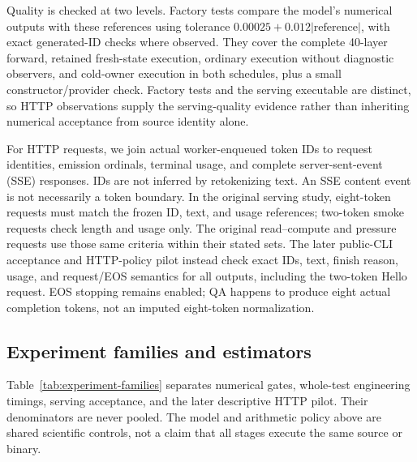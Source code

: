 Quality is checked at two levels. Factory tests compare the model's numerical
outputs with these references using tolerance
$0.00025+0.012|\mathrm{reference}|$, with exact generated-ID checks where
observed. They cover the complete 40-layer forward, retained fresh-state
execution, ordinary execution without diagnostic observers, and cold-owner
execution in both schedules, plus a small constructor/provider check.
Factory tests and the serving executable are distinct, so HTTP observations
supply the serving-quality evidence rather than inheriting numerical
acceptance from source identity alone.

For HTTP requests, we join actual worker-enqueued token IDs to request
identities, emission ordinals, terminal usage, and complete server-sent-event
(SSE) responses. IDs are not inferred by retokenizing text. An SSE content
event is not necessarily a token boundary. In the original serving study,
eight-token requests must match the frozen ID,
text, and usage references; two-token smoke requests check length and usage
only. The original read--compute and pressure requests use those same criteria
within their stated sets. The later public-CLI acceptance and HTTP-policy pilot
instead check exact IDs, text, finish reason, usage, and request/EOS semantics
for all outputs, including the two-token Hello request. EOS stopping remains
enabled; QA happens to produce eight actual completion tokens, not an
imputed eight-token normalization.

\subsection{Experiment families and estimators}
Table~\ref{tab:experiment-families} separates numerical gates, whole-test
engineering timings, serving acceptance, and the later descriptive HTTP
pilot. Their denominators are never pooled. The model and arithmetic policy
above are shared scientific controls, not a claim that all stages execute
the same source or binary.

